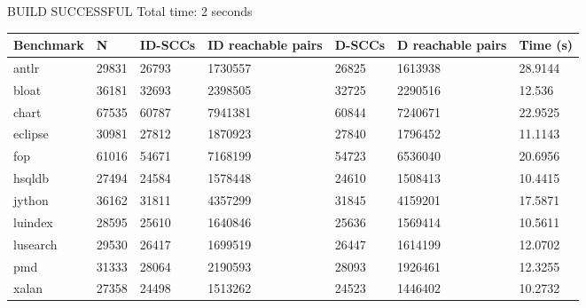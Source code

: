 BUILD SUCCESSFUL
Total time: 2 seconds

\begin{table}[]
\begin{tabular}{|l|l|l|l|l|l|l|}
\hline
Benchmark & N & ID-SCCs & ID reachable pairs & D-SCCs & D reachable pairs & Time (s) \\ \hline
antlr & 29831 & 26793 & 1730557 & 26825 & 1613938 & 28.9144 \\ \hline
bloat & 36181 & 32693 & 2398505 & 32725 & 2290516 & 12.536 \\ \hline
chart & 67535 & 60787 & 7941381 & 60844 & 7240671 & 22.9525 \\ \hline
eclipse & 30981 & 27812 & 1870923 & 27840 & 1796452 & 11.1143 \\ \hline
fop & 61016 & 54671 & 7168199 & 54723 & 6536040 & 20.6956 \\ \hline
hsqldb & 27494 & 24584 & 1578448 & 24610 & 1508413 & 10.4415 \\ \hline
jython & 36162 & 31811 & 4357299 & 31845 & 4159201 & 17.5871 \\ \hline
luindex & 28595 & 25610 & 1640846 & 25636 & 1569414 & 10.5611 \\ \hline
lusearch & 29530 & 26417 & 1699519 & 26447 & 1614199 & 12.0702 \\ \hline
pmd & 31333 & 28064 & 2190593 & 28093 & 1926461 & 12.3255 \\ \hline
xalan & 27358 & 24498 & 1513262 & 24523 & 1446402 & 10.2732 \\ \hline
\end{tabular}
\end{table}
